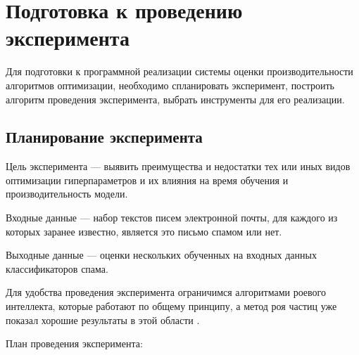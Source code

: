 \section{Подготовка к проведению эксперимента}

Для подготовки к программной реализации системы оценки производительности
алгоритмов оптимизации, необходимо спланировать эксперимент,
построить алгоритм проведения эксперимента, выбрать инструменты для его реализации.

\subsection{Планирование эксперимента}

Цель эксперимента — выявить преимущества и недостатки тех или иных видов
оптимизации гиперпараметров и их влияния на время обучения и производительность
модели.

Входные данные — набор текстов писем электронной почты, для каждого из которых
заранее известно, является это письмо спамом или нет.

Выходные данные — оценки нескольких обученных на входных данных классификаторов спама.

Для удобства проведения эксперимента ограничимся алгоритмами роевого интеллекта,
которые работают по общему принципу, а метод роя частиц уже показал хорошие
результаты в этой области \cite{IEEE}.

План проведения эксперимента:

